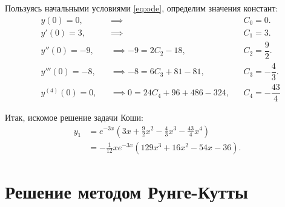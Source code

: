\documentclass[a4paper,12pt]{article}
\begin{document}
Пользуясь начальными условиями \ref{eq:ode}, определим значения констант:
\begin{equation*}
    \begin{aligned}
        &y(0) = 0, &&\implies && C_0 = 0. \\
        &y'(0) = 3, &&\implies && C_1 = 3. \\
        &y''(0) = -9, &&\implies -9 = 2 C_2 - 18, &&
            C_2 = \dfrac{9}{2}. \\
        &y'''(0) = -8, &&\implies -8 = 6 C_3 + 81 - 81, &&
            C_3 = -\dfrac{4}{3}. \\
        &y^{(4)}(0) = 0, &&\implies 0 = 24 C_4 + 96 + 486 - 324, &&
            C_4 = -\dfrac{43}{4}
    \end{aligned}
\end{equation*}

Итак, искомое решение задачи Коши:
\begin{equation}
    \begin{aligned}
        y_1 &= e^{-3x}
            (3x + \frac{9}{2} x^2 - \frac{4}{3} x^3 - \frac{43}{4} x^4) \\
            &= -\frac{1}{12} x e^{-3x} (129 x^3 + 16 x^2 - 54 x - 36).
    \end{aligned}
\end{equation}

\pagebreak

\section{Решение методом Рунге-Кутты}
\end{document}
